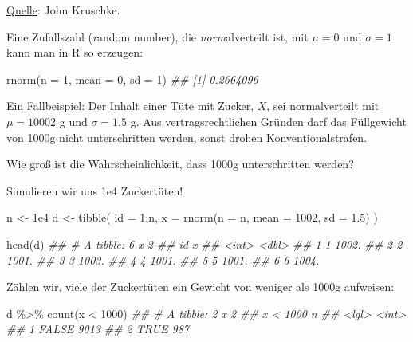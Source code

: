 \documentclass[
  a4paper,
  DIV=11]{scrreprt}
\newenvironment{Shaded}{\begin{snugshade}}{\end{snugshade}}
\newcommand{\AttributeTok}[1]{\textcolor[rgb]{0.40,0.45,0.13}{#1}}
\newcommand{\DecValTok}[1]{\textcolor[rgb]{0.68,0.00,0.00}{#1}}
\newcommand{\DocumentationTok}[1]{\textcolor[rgb]{0.37,0.37,0.37}{\textit{#1}}}
\newcommand{\FloatTok}[1]{\textcolor[rgb]{0.68,0.00,0.00}{#1}}
\newcommand{\FunctionTok}[1]{\textcolor[rgb]{0.28,0.35,0.67}{#1}}
\newcommand{\NormalTok}[1]{\textcolor[rgb]{0.00,0.23,0.31}{#1}}
\newcommand{\OtherTok}[1]{\textcolor[rgb]{0.00,0.23,0.31}{#1}}
\newcommand{\SpecialCharTok}[1]{\textcolor[rgb]{0.37,0.37,0.37}{#1}}
\theoremstyle{definition}
\theoremstyle{remark}
\begin{document}
\href{https://jkkweb.sitehost.iu.edu/KruschkeFreqAndBayesAppTutorial.html\#data_are_described_by_mathematical_models}{Quelle}:
John Kruschke.

Eine Zufallszahl (\emph{r}andom number), die \emph{norm}alverteilt ist,
mit \(\mu=0\) und \(\sigma=1\) kann man in R so erzeugen:

\begin{Shaded}
\begin{Highlighting}[]
\FunctionTok{rnorm}\NormalTok{(}\AttributeTok{n =} \DecValTok{1}\NormalTok{, }\AttributeTok{mean =} \DecValTok{0}\NormalTok{, }\AttributeTok{sd =} \DecValTok{1}\NormalTok{)}
\DocumentationTok{\#\# [1] 0.2664096}
\end{Highlighting}
\end{Shaded}

Ein Fallbeispiel: Der Inhalt einer Tüte mit Zucker, \(X\), sei
normalverteilt mit \(\mu = 10002\) g und \(\sigma=1.5\) g. Aus
vertragsrechtlichen Gründen darf das Füllgewicht von 1000g nicht
unterschritten werden, sonst drohen Konventionalstrafen.

Wie groß ist die Wahrscheinlichkeit, dass 1000g unterschritten werden?

Simulieren wir uns 1e4 Zuckertüten!

\begin{Shaded}
\begin{Highlighting}[]
\NormalTok{n }\OtherTok{\textless{}{-}} \FloatTok{1e4}
\NormalTok{d }\OtherTok{\textless{}{-}} 
  \FunctionTok{tibble}\NormalTok{(}
    \AttributeTok{id =} \DecValTok{1}\SpecialCharTok{:}\NormalTok{n,}
    \AttributeTok{x =} \FunctionTok{rnorm}\NormalTok{(}\AttributeTok{n =}\NormalTok{ n, }\AttributeTok{mean =} \DecValTok{1002}\NormalTok{, }\AttributeTok{sd =} \FloatTok{1.5}\NormalTok{)}
\NormalTok{  )}

\FunctionTok{head}\NormalTok{(d)}
\DocumentationTok{\#\# \# A tibble: 6 x 2}
\DocumentationTok{\#\#      id     x}
\DocumentationTok{\#\#   \textless{}int\textgreater{} \textless{}dbl\textgreater{}}
\DocumentationTok{\#\# 1     1 1002.}
\DocumentationTok{\#\# 2     2 1001.}
\DocumentationTok{\#\# 3     3 1003.}
\DocumentationTok{\#\# 4     4 1001.}
\DocumentationTok{\#\# 5     5 1001.}
\DocumentationTok{\#\# 6     6 1004.}
\end{Highlighting}
\end{Shaded}

Zählen wir, viele der Zuckertüten ein Gewicht von weniger als 1000g
aufweisen:

\begin{Shaded}
\begin{Highlighting}[]
\NormalTok{d }\SpecialCharTok{\%\textgreater{}\%} 
  \FunctionTok{count}\NormalTok{(x }\SpecialCharTok{\textless{}} \DecValTok{1000}\NormalTok{)}
\DocumentationTok{\#\# \# A tibble: 2 x 2}
\DocumentationTok{\#\#   \textasciigrave{}x \textless{} 1000\textasciigrave{}     n}
\DocumentationTok{\#\#   \textless{}lgl\textgreater{}      \textless{}int\textgreater{}}
\DocumentationTok{\#\# 1 FALSE       9013}
\DocumentationTok{\#\# 2 TRUE         987}
\end{Highlighting}
\end{Shaded}
\end{document}
